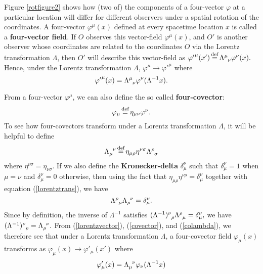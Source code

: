 Figure \ref{rotfigure2} shows how (two of) the components of a four-vector $\varphi$ at a particular location will differ for different observers under a spatial rotation of the coordinates. A four-vector $\varphi^\mu(x)$ defined at every spacetime location $x$ is called a \textbf{four-vector field}. If $O$ observes this vector-field $\varphi^\mu(x)$, and $O'$ is another observer whose coordinates are related to the coordinates $O$ via the Lorentz transformation $\Lambda$, then $O'$ will describe this vector-field as ${\varphi'}^\mu(x')\myeq\Lambda\indices{^\mu_\nu}\varphi^\nu(x).$ Hence, under the Lorentz transformation $\Lambda$, ${\varphi}^\mu\rightarrow {\varphi'}^\mu$ where
\begin{equation}\label{lorentzvector}
{\varphi'}^\mu(x)=\Lambda\indices{^\mu_\nu}\varphi^\nu(\Lambda^{-1}x).
\end{equation} 



From a four-vector $\varphi^\mu$, we can also define the so called \textbf{four-covector}: 
\begin{equation}\label{covector}
	\varphi_\mu\myeq\eta_{\mu\nu}\varphi^\nu.
\end{equation}
To see how four-covectors transform under a Lorentz transformation $\Lambda$, it will be helpful to define 
\begin{equation}\label{colambda}
	\Lambda\indices{_\mu^\nu}\myeq\eta_{\mu\rho}\eta^{\nu\sigma}\Lambda\indices{^\rho_\sigma}
\end{equation}
where $\eta^{\nu\sigma}=\eta_{\nu\sigma}$. If we also define the \textbf{Kronecker-delta} $\delta^\nu_\mu$ such that $\delta^\nu_\mu=1$ when $\mu=\nu$ and $\delta^\nu_\mu=0$ otherwise, then using the fact that $\eta_{\mu\rho}\eta^{\nu\rho}=\delta^\nu_\mu$ together with equation (\ref{lorentztrans}), we have 
\begin{equation}\label{lambdainverse}
\Lambda\indices{^\rho_\mu}\Lambda\indices{_\rho^\nu}=\delta^\nu_\mu.
\end{equation}
Since by definition, the inverse of $\Lambda^{-1}$ satisfies 
$(\Lambda^{-1})\indices{^\nu_\rho}\Lambda\indices{^\rho_\mu}=\delta^\nu_\mu,$
 we have $(\Lambda^{-1})\indices{^\nu_\rho}=\Lambda\indices{_\rho^\nu}.$  From (\ref{lorentzvector}), (\ref{covector}), and (\ref{colambda}), we therefore see that under a Lorentz transformation $\Lambda$, a four-covector field $\varphi_\mu(x)$ transforms as $\varphi_\mu(x)\rightarrow\varphi'_\mu(x')$
where
\begin{equation}\label{lorentzcovector}
\varphi'_\mu(x)=\Lambda\indices{_\mu^\nu}\varphi_\nu(\Lambda^{-1}x)
\end{equation}
 

